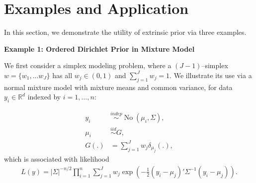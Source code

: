 \documentclass[10pt]{article}
\newcommand{\bb}[1]{\mathbb{#1}}
\newcommand{\mc}[1]{\mathcal{#1}}
\DeclareMathOperator{\No}{No}
\DeclareMathOperator{\1}{\mathbbm{1}}
\begin{document}




\section{Examples and Application}

In this section, we demonstrate the utility of extrinsic prior via three examples. %

{\bf Example 1: Ordered Dirichlet Prior in Mixture Model}

We first consider a simplex modeling problem, where a $(J-1)$--simplex $w=\{w_1,\ldots w_J\}$ has all $w_j\in (0,1)$ and $\sum_{j=1}^J w_j=1$. We illustrate its use via a normal mixture model with mixture means and common variance, for data $y_i\in \bb R^d$ indexed by $i=1,\ldots,n$:

\begin{equation*}
\begin{aligned}
y_i &\stackrel{indep}{\sim} \No(\mu_i,\Sigma),\\
\mu_i &\stackrel{iid}{\sim} G,\\
G(.) & = \sum_{j=1}^{J} w_j \delta_{\mu_j}(.),
\end{aligned}
\end{equation*}
which is associated with likelihood
\begin{equation*}
\begin{aligned}
L(y) = |\Sigma|^{-n/2}\prod_{i=1}^n \sum_{j=1}^{J} w_j \exp\left(-\frac{1}{2}{ (y_i-\mu_j)'\Sigma^{-1}(y_i-\mu_j)}\right).
\end{aligned}
\end{equation*}
\end{document}
